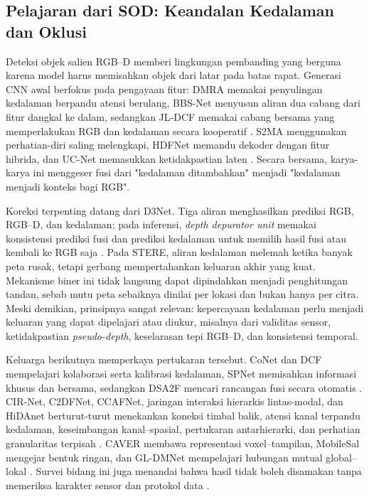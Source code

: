 \subsection{Pelajaran dari SOD: Keandalan Kedalaman dan Oklusi}

Deteksi objek salien RGB--D memberi lingkungan pembanding yang berguna karena
model harus memisahkan objek dari latar pada batas rapat. Generasi CNN awal
berfokus pada pengayaan fitur: DMRA memakai penyulingan kedalaman berpandu
atensi berulang, BBS-Net menyusun aliran dua cabang dari fitur dangkal ke
dalam, sedangkan JL-DCF memakai cabang bersama yang memperlakukan RGB dan
kedalaman secara kooperatif \cite{piao2019dmra,fan2020bbsnet,fu2020jldcf}.
S2MA menggunakan perhatian-diri saling melengkapi, HDFNet memandu dekoder
dengan fitur hibrida, dan UC-Net memasukkan ketidakpastian laten
\cite{liu2020s2ma,pang2020hdfnet,zhang2020ucnet}. Secara bersama, karya-karya
ini menggeser fusi dari "kedalaman ditambahkan" menjadi "kedalaman menjadi
konteks bagi RGB".

Koreksi terpenting datang dari D3Net. Tiga aliran menghasilkan prediksi RGB,
RGB--D, dan kedalaman; pada inferensi, \textit{depth depurator unit} memakai
konsistensi prediksi fusi dan prediksi kedalaman untuk memilih hasil fusi atau
kembali ke RGB saja \cite{fan2020d3net}. Pada STERE, aliran kedalaman melemah
ketika banyak peta rusak, tetapi gerbang mempertahankan keluaran akhir yang
kuat. Mekanisme biner ini tidak langsung dapat dipindahkan menjadi penghitungan
tandan, sebab mutu peta sebaiknya dinilai per lokasi dan bukan hanya per citra.
Meski demikian, prinsipnya sangat relevan: kepercayaan kedalaman perlu
menjadi keluaran yang dapat dipelajari atau diukur, misalnya dari validitas
sensor, ketidakpastian \textit{pseudo-depth}, keselarasan tepi RGB--D, dan
konsistensi temporal.

Keluarga berikutnya memperkaya pertukaran tersebut. CoNet dan DCF mempelajari
kolaborasi serta kalibrasi kedalaman, SPNet memisahkan informasi khusus dan
bersama, sedangkan DSA2F mencari rancangan fusi secara otomatis
\cite{ji2020conet,ji2021dcf,zhou2021spnet,sun2021dsa2f}. CIR-Net, C2DFNet,
CCAFNet, jaringan interaksi hierarkis lintas-modal, dan HiDAnet berturut-turut
menekankan koneksi timbal balik, atensi kanal terpandu kedalaman, keseimbangan
kanal--spasial, pertukaran antarhierarki, dan perhatian granularitas terpisah
\cite{cong2022cirnet,zhang2022c2dfnet,zhou2022ccafnet,chen2023cmhi,wu2023hidanet}.
CAVER membawa representasi voxel--tampilan, MobileSal mengejar bentuk ringan,
dan GL-DMNet mempelajari hubungan mutual global--lokal \cite{pang2023caver,wu2022mobilesal,yi2025gldmnet}.
Survei bidang ini juga menandai bahwa hasil tidak boleh disamakan tanpa
memeriksa karakter sensor dan protokol data \cite{zhou2021rgbdsurvey}.

